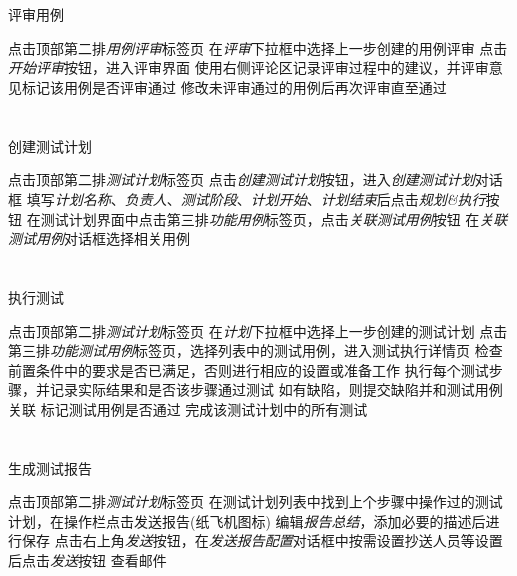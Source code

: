 \documentclass[12pt,addpoints,fleqn]{exam}
\begin{document}
\begin{questions}
\begin{parts}
  \part{}评审用例
  \begin{subparts}
    \subpart{}点击顶部第二排\emph{用例评审}标签页
    \subpart{}在\emph{评审}下拉框中选择上一步创建的用例评审
    \subpart{}点击\emph{开始评审}按钮，进入评审界面
    \subpart{}使用右侧评论区记录评审过程中的建议，并评审意见标记该用例是否评审通过
    \subpart{}修改未评审通过的用例后再次评审直至通过
  \end{subparts}

  \part{}创建测试计划
  \begin{subparts}
    \subpart{}点击顶部第二排\emph{测试计划}标签页
    \subpart{}点击\emph{创建测试计划}按钮，进入\emph{创建测试计划}对话框
    \subpart{}填写\emph{计划名称}、\emph{负责人}、\emph{测试阶段}、\emph{计划开始}、\emph{计划结束}后点击\emph{规划\&执行}按钮
    \subpart{}在测试计划界面中点击第三排\emph{功能用例}标签页，点击\emph{关联测试用例}按钮
    \subpart{}在\emph{关联测试用例}对话框选择相关用例
  \end{subparts}

  \part{}执行测试
  \begin{subparts}
    \subpart{}点击顶部第二排\emph{测试计划}标签页
    \subpart{}在\emph{计划}下拉框中选择上一步创建的测试计划
    \subpart{}点击第三排\emph{功能测试用例}标签页，选择列表中的测试用例，进入测试执行详情页
    \subpart{}检查前置条件中的要求是否已满足，否则进行相应的设置或准备工作
    \subpart{}执行每个测试步骤，并记录实际结果和是否该步骤通过测试
    \subpart{}如有缺陷，则提交缺陷并和测试用例关联
    \subpart{}标记测试用例是否通过
    \subpart{}完成该测试计划中的所有测试
  \end{subparts}

  \part{}生成测试报告
  \begin{subparts}
    \subpart{}点击顶部第二排\emph{测试计划}标签页
    \subpart{}在测试计划列表中找到上个步骤中操作过的测试计划，在操作栏点击发送报告(纸飞机图标)
    \subpart{}编辑\emph{报告总结}，添加必要的描述后进行保存
    \subpart{}点击右上角\emph{发送}按钮，在\emph{发送报告配置}对话框中按需设置抄送人员等设置后点击\emph{发送}按钮
    \subpart{}查看邮件
  \end{subparts}


\end{parts}
\end{questions}
\end{document}
